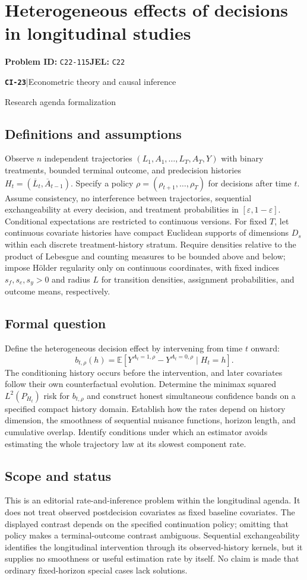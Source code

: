\documentclass[11pt,a4paper]{article}
\newcommand{\E}{\mathbb E}
\newcommand{\entrymeta}[3]{{\sffamily\small\color{muted}\textbf{\texttt{#1}}\quad|\quad #2\par #3\par}}
\begin{document}
\section*{Heterogeneous effects of decisions in longitudinal studies}
\textbf{Problem ID:} \texttt{C22-115}\quad \textbf{JEL:} \texttt{C22}\par
\label{problem:OP-0502}
\label{beyond:CI-23}
\entrymeta{CI-23}{Econometric theory and causal inference}{Research agenda formalization}
\subsection*{Definitions and assumptions}
Observe $n$ independent trajectories $(L_1,A_1,\ldots,L_T,A_T,Y)$ with binary treatments, bounded terminal outcome, and predecision histories $H_t=(\overline L_t,\overline A_{t-1})$. Specify a policy $\rho=(\rho_{t+1},\ldots,\rho_T)$ for decisions after time $t$. Assume consistency, no interference between trajectories, sequential exchangeability at every decision, and treatment probabilities in $[\varepsilon,1-\varepsilon]$. Conditional expectations are restricted to continuous versions. For fixed $T$, let continuous covariate histories have compact Euclidean supports of dimensions $D_s$ within each discrete treatment-history stratum. Require densities relative to the product of Lebesgue and counting measures to be bounded above and below; impose H\"older regularity only on continuous coordinates, with fixed indices $s_f,s_e,s_y>0$ and radius $L$ for transition densities, assignment probabilities, and outcome means, respectively.
\subsection*{Formal question}
Define the heterogeneous decision effect by intervening from time $t$ onward:
\[
 b_{t,\rho}(h)=
 \E[Y^{A_t=1,\rho}-Y^{A_t=0,\rho}\mid H_t=h].
\]
The conditioning history occurs before the intervention, and later covariates follow their own counterfactual evolution. Determine the minimax squared $L^2(P_{H_t})$ risk for $b_{t,\rho}$ and construct honest simultaneous confidence bands on a specified compact history domain. Establish how the rates depend on history dimension, the smoothness of sequential nuisance functions, horizon length, and cumulative overlap. Identify conditions under which an estimator avoids estimating the whole trajectory law at its slowest component rate.
\subsection*{Scope and status}
This is an editorial rate-and-inference problem within the longitudinal agenda. It does not treat observed postdecision covariates as fixed baseline covariates. The displayed contrast depends on the specified continuation policy; omitting that policy makes a terminal-outcome contrast ambiguous. Sequential exchangeability identifies the longitudinal intervention through its observed-history kernels, but it supplies no smoothness or useful estimation rate by itself. No claim is made that ordinary fixed-horizon special cases lack solutions.
\end{document}
